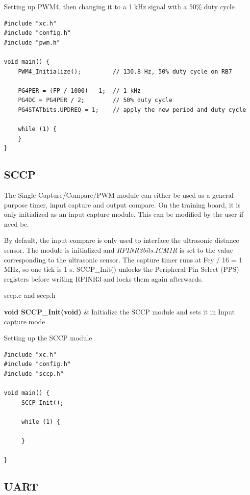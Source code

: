 \documentclass[
  11pt,
  letterpaper,
  oneside,
  DIV=13,               %
  parskip=half,          %
  headings=normal,
  chapterprefix=false,
  toc=listof,
  numbers=noenddot,
]{scrbook}
\newenvironment{functiontable}[1]
  {\par\smallskip\noindent\small\tabularx{\linewidth}{#1}}
  {\endtabularx\par\medskip}
\begin{document}
Setting up PWM4, then changing it to a 1 kHz signal with a 50\% duty cycle
\begin{lstlisting}
#include "xc.h"
#include "config.h"
#include "pwm.h"

void main() {
    PWM4_Initialize();         // 130.8 Hz, 50% duty cycle on RB7

    PG4PER = (FP / 1000) - 1;  // 1 kHz
    PG4DC = PG4PER / 2;        // 50% duty cycle
    PG4STATbits.UPDREQ = 1;    // apply the new period and duty cycle

    while (1) {
    }
}
\end{lstlisting}

\subsection{SCCP}

The Single Capture/Compare/PWM module can either be used as a general purpose timer, input capture and output compare. On the training board, it is only initialized as an input capture module. This can be modified by the user if need be.

By default, the input compare is only used to interface the ultrasonic distance sensor. The module is initialized and  \emph{RPINR3bits.ICM1R } is set to the value corresponding to the ultrasonic sensor. The capture timer runs at Fcy / 16 = 1 MHz, so one tick is 1 \textmu{}s. SCCP\_Init() unlocks the Peripheral Pin Select (PPS) registers before writing RPINR3 and locks them again afterwards.

sccp.c and sccp.h
\begin{functiontable}{>{\raggedright\arraybackslash}p{0.36\linewidth}>{\raggedright\arraybackslash}X}
\toprule
\textbf{void SCCP\_Init(void)} & Initialize the SCCP module and sets it in Input capture mode \\
\bottomrule
\end{functiontable}

Setting up the SCCP module
\begin{lstlisting}
#include "xc.h"
#include "config.h"
#include "sccp.h"

void main() {
     SCCP_Init();

     while (1) {
       
     }

}
\end{lstlisting}

\subsection{UART}
\end{document}

